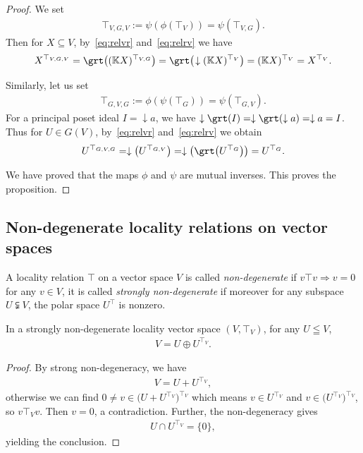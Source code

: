 \documentclass[pdftex]{sigma}
\numberwithin{equation}{section}
\newcommand{\K}{\mathbb{K}}
\newcommand{\loc}{locality\xspace}
\begin{document}
\begin {proof}
We set
\begin{gather*}
\top_{V,G,V}:=\psi(\phi(\top_V))=\psi(\top_{V,G}).
\end{gather*}
Then for $X\subseteq V$, by~\eqref{eq:relvr} and~\eqref{eq:relrv} we have
\begin{gather*}
X^{\top_{V,G,V}}= \grt \big( (\K X)^{\top_{V,G}}\big) =\grt \big (\!\downarrow (\K X)^{\top_V}\big)
=(\K X)^{\top_V} = X^{\top_V}.
\end{gather*}

Similarly, let us set
\begin{gather*}
\top_{G,V,G}:=\phi(\psi(\top_G)) = \psi(\top_{G,V}).
\end{gather*}
For a principal poset ideal $I=\downarrow a$, we have $\downarrow \grt (I) = \downarrow \grt (\downarrow a) = \downarrow a=I$.
Thus for $U\in G(V)$, by~\eqref{eq:relvr} and~\eqref{eq:relrv} we obtain
\begin{gather*}
U^{\top_{G,V,G}} = \downarrow \big(U^{\top_{G,V}}\big) = \downarrow \big (\grt \big(U^{\top_G}\big)\big) =U^{\top_G}.
\end{gather*}

We have proved that the maps $\phi$ and $\psi$ are mutual inverses. This proves the proposition.
\end{proof}

\subsection {Non-degenerate locality relations on vector spaces}
\begin{Definition}
\label{de:vpproper}
A \loc relation $\top$ on a vector space $V$ is called \emph{non-degenerate} if $v\top v \Rightarrow v=0$ for any $v\in V$,
it is called \emph{strongly non-degenerate} if moreover for any subspace $ U \subsetneqq
V$, the polar space $U^\top $ is nonzero.
\end{Definition}

\begin {lemma}%
In a strongly non-degenerate locality vector space $(V, \top _V)$, for any $U\leqq V$,
\begin{gather*}%
V=U\oplus U^{\top _V}.
\end{gather*}
\end{lemma}

\begin {proof}
By strong non-degeneracy, we have
\begin{gather*}
V=U+U^{\top _V},
\end{gather*}
otherwise we can find $0\neq v\in \big(U+U^{\top _V}\big)^{\top _V}$ which means $v\in U^{\top _V}$ and $v\in \big(U^{\top_V}\big)^{\top_V}$, so $v\top _V v$. Then $v=0$, a contradiction. Further, the non-degeneracy gives
\begin{gather*}
U\cap U^{\top _V}=\{0\},\end{gather*}
yielding the conclusion.
\end {proof}
\end{document}
